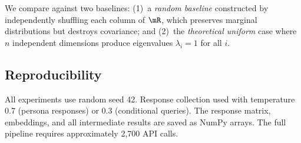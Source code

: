 We compare against two baselines: (1)~a {\em random baseline} constructed by independently shuffling each column of $\mR$, which preserves marginal distributions but destroys covariance; and (2)~the {\em theoretical uniform} case where $n$ independent dimensions produce eigenvalues $\lambda_i = 1$ for all $i$.

\subsection{Reproducibility}

All experiments use random seed 42. Response collection used \gptmini with temperature 0.7 (persona responses) or 0.3 (conditional queries). The response matrix, embeddings, and all intermediate results are saved as NumPy arrays. The full pipeline requires approximately 2,700 API calls.
